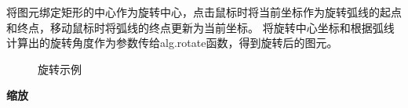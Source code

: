 \documentclass[a4paper,UTF8]{article}
\begin{document}
将图元绑定矩形的中心作为旋转中心，点击鼠标时将当前坐标作为旋转弧线的起点和终点，移动鼠标时将弧线的终点更新为当前坐标。
将旋转中心坐标和根据弧线计算出的旋转角度作为参数传给alg.rotate函数，得到旋转后的图元。
\begin{figure}[H]
    \centering
        \caption{旋转示例}
\end{figure}


\textbf{缩放}
\end{document}
